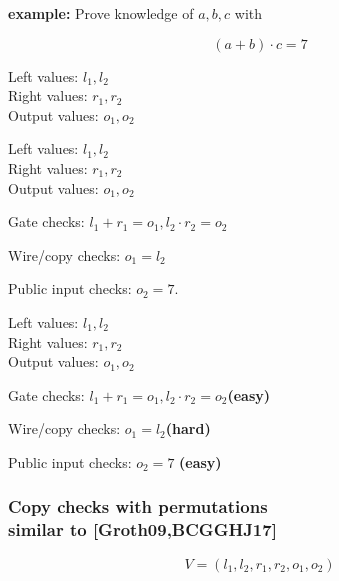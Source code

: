 \documentclass[shadesubsections,trans,14pt,mathserif]{beamer}
\begin{document}
\begin{frame}
\textbf{example:} Prove knowledge of $a,b,c$ with
 
 
 
 
 
\[(a+b)\cdot c =7\]




\end{frame}


\begin{frame}
Left values: 
$l_1,l_2$\\
Right values: $r_1,r_2$\\
Output values:
$o_1,o_2$


 \vspace{0.2in}

\end{frame}

\begin{frame}
Left values: 
$l_1,l_2$\\
Right values: $r_1,r_2$\\
Output values:
$o_1,o_2$


 \vspace{0.2in}

Gate checks:
 $l_1 + r_1 = o_1 , l_2\cdot r_2 = o_2$


Wire/copy checks:
$o_1 = l_2$

Public input checks: $o_2=7$.
\end{frame}
\begin{frame}


Left values: 
$l_1,l_2$\\
Right values: $r_1,r_2$\\
Output values:
$o_1,o_2$


 \vspace{0.2in}

Gate checks:
 $l_1 + r_1 = o_1 , l_2\cdot r_2 = o_2$\;\;\textbf{\small{(easy)}}


Wire/copy checks:
$o_1 = l_2$\;\;\textbf{\small{(hard)}}

Public input checks: $o_2=7$ \textbf{\small{(easy)}}
\end{frame}


\begin{frame}
\frametitle{Copy checks with permutations\\ \normalsize{similar to [Groth09,BCGGHJ17]}}   %
 
 
 \[V= (l_1,l_2,r_1,r_2,o_1,o_2)\]
 
 

\end{frame}
\end{document}
